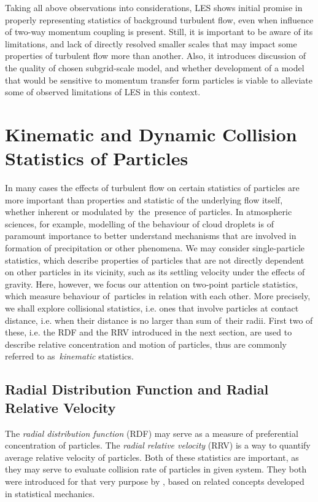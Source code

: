 \documentclass{pracamgren}
\begin{document}
Taking all above observations into considerations, LES shows initial promise in properly representing statistics of background turbulent flow, even when influence of two-way momentum coupling is present.
Still, it is important to be aware of its limitations, and lack of directly resolved smaller scales that may impact some properties of turbulent flow more than another.
Also, it introduces discussion of the quality of chosen subgrid-scale model, and whether development of a model that would be sensitive to momentum transfer form particles is viable to alleviate some of observed limitations of LES in this context.



\section{Kinematic and Dynamic Collision Statistics of Particles}
\label{sc:ch2.coll}

In many cases the effects of turbulent flow on certain statistics of particles are more important than properties and statistic of the underlying flow itself, whether inherent or modulated by~the~presence of particles.
In atmospheric sciences, for example, modelling of the behaviour of cloud droplets is of paramount importance to better understand mechanisms that are involved in formation of precipitation or other phenomena.
We may consider single-particle statistics, which describe properties of particles that are not directly dependent on other particles in its vicinity, such as its settling velocity under the effects of gravity.
Here, however, we focus our attention on two-point particle statistics, which measure behaviour of~particles in relation with each other.
More precisely, we shall explore collisional statistics, i.e. ones that involve particles at contact distance, i.e. when their distance is no larger than sum of~their radii.
First two of these, i.e. the RDF and the RRV introduced in the next section, are used to describe relative concentration and motion of particles, thus are commonly referred to as~\emph{kinematic} statistics. 

\smallskip

\subsection{Radial Distribution Function and Radial Relative Velocity}
\label{ssc:ch2.coll.rdfrrv}

The \emph{radial distribution function} (RDF) may serve as a measure of preferential concentration of particles.
The \emph{radial relative velocity} (RRV) is a way to quantify average relative velocity of particles.
Both of these statistics are important, as they may serve to evaluate collision rate of particles in given system.
They both were introduced for that very purpose by \textcite{Sundaram1997}, based on related concepts developed in statistical mechanics.
\end{document}
